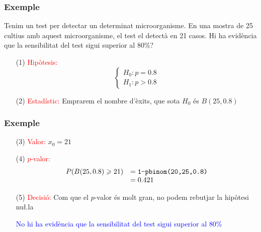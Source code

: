 \documentclass[12pt,t]{beamer}\usepackage[]{graphicx}\usepackage[]{color}
\newcommand{\red}[1]{\textcolor{red}{#1}}
\newcommand{\blue}[1]{\textcolor{blue}{#1}}
\renewcommand{\geq}{\geqslant}
\theoremstyle{plain}
\theoremstyle{definition}
\begin{document}
\begin{frame}
\frametitle{Exemple}
Tenim un test per detectar un determinat microorganisme. En una mostra de 25 cultius amb aquest microorganisme, el test el detectà en 21 casos. Hi ha evidència que la sensibilitat del test sigui superior al 80\%?
\pause\medskip

\begin{itemize}
\item [(1)] \red{Hipòtesis:}
$$\left\{\begin{array}{l}
H_{0}:p=0.8\\
H_{1}:p>0.8
\end{array}
\right.$$
\pause

\item[(2)]  \red{Estadístic:} Emprarem el nombre d'èxits, que sota $H_0$ és $B(25,0.8)$
\end{itemize}
\end{frame}



\begin{frame}[fragile]
\frametitle{Exemple}

\begin{itemize}

\item[(3)] \red{Valor:} $x_0=21$
\medskip

\item[(4)] \red{$p$-valor:}
$$
\begin{array}{rl}
P(B(25,0.8)\geq 21) & =\mbox{\texttt{1-pbinom(20,25,0.8)}}\\ & 
=0.421
\end{array}
$$
\pause

\item[(5)] \red{Decisió:} Com que el $p$-valor és molt gran,  no podem rebutjar  la hipòtesi nu\l.la\medskip

\blue{No hi ha evidència que la sensibilitat del test sigui superior al 80\%}

\end{itemize}


\end{frame}
\end{document}
